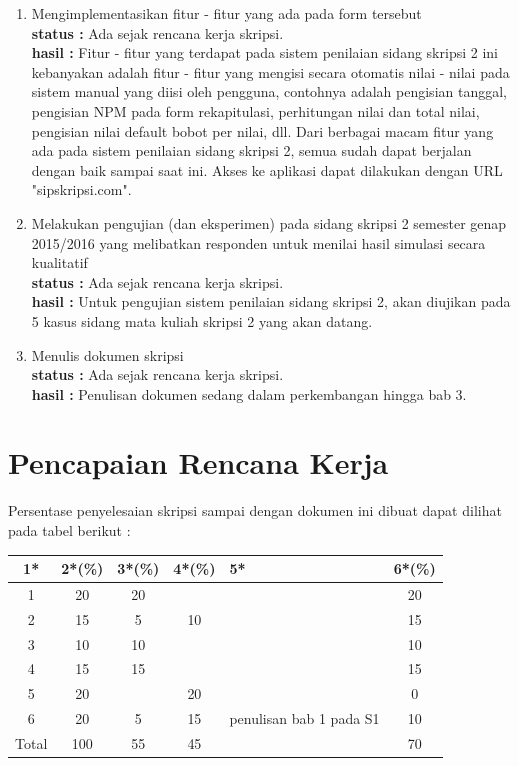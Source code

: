 \documentclass[a4paper,twoside]{article}
\begin{document}
\begin{enumerate}
		\item Mengimplementasikan fitur - fitur yang ada pada form tersebut\\
		{\bf status :} Ada sejak rencana kerja skripsi.\\
		{\bf hasil :} Fitur - fitur yang terdapat pada sistem penilaian sidang skripsi 2 ini kebanyakan adalah fitur - fitur yang mengisi secara otomatis nilai - nilai pada sistem manual yang diisi oleh pengguna, contohnya adalah pengisian tanggal, pengisian NPM pada form rekapitulasi, perhitungan nilai dan total nilai, pengisian nilai default bobot per nilai, dll. Dari berbagai macam fitur yang ada pada sistem penilaian sidang skripsi 2, semua sudah dapat berjalan dengan baik sampai saat ini.  Akses ke aplikasi dapat dilakukan dengan URL "sipskripsi.com".

		\item Melakukan pengujian (dan eksperimen) pada sidang skripsi 2 semester genap 2015/2016 yang melibatkan responden untuk menilai hasil simulasi secara kualitatif\\
		{\bf status :} Ada sejak rencana kerja skripsi.\\
		{\bf hasil :} Untuk pengujian sistem penilaian sidang skripsi 2, akan diujikan pada 5 kasus sidang mata kuliah  skripsi 2 yang akan datang.

		\item Menulis dokumen skripsi\\
		{\bf status :} Ada sejak rencana kerja skripsi.\\
		{\bf hasil :} Penulisan dokumen sedang dalam perkembangan hingga bab 3.
	
	\end{enumerate}

\section{Pencapaian Rencana Kerja}
Persentase penyelesaian skripsi sampai dengan dokumen ini dibuat dapat dilihat pada tabel berikut :

\begin{center}
  \begin{tabular}{ | c | c | c | c | l | c |}
    \hline
    1*  & 2*(\%) & 3*(\%) & 4*(\%) &5* &6*(\%)\\ \hline \hline
    1   & 20  & 20  &  & & 20 \\ \hline
    2   & 15 & 5  & 10  & & 15 \\ \hline
    3   & 10  & 10  &  &  & 10 \\ \hline
    4   & 15  & 15  &   &  & 15 \\ \hline
    5   & 20 &   & 20 & & 0 \\ \hline
    6   & 20 & 	5 & 15  & {\footnotesize penulisan bab 1 pada S1}  & 10 \\\hline
    Total  & 100  & 55  & 45 &  & 70\\ \hline
                          \end{tabular}
\end{center}
\end{document}
